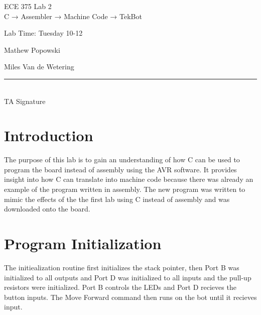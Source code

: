 \documentclass[12pt,letterpaper]{article}
\begin{document}
\begin{titlepage}
    \vspace*{4cm}
    \begin{flushright}
    {\huge
        ECE 375 Lab 2\\[1cm]
    }
    {\large
        C → Assembler → Machine Code → TekBot
    }
    \end{flushright}
    \begin{flushleft}
    Lab Time: Tuesday 10-12
    \end{flushleft}
    \begin{flushright}
    Mathew Popowski

    Miles Van de Wetering
    \vfill
    \rule{5in}{.5mm}\\
    TA Signature
    \end{flushright}

\end{titlepage}

\section{Introduction}
The purpose of this lab is to gain an understanding of how C can be used to program the board instead of assembly using the AVR software. It provides insight into how C can translate into machine code because there was already an example of the program written in assembly. The new program was written to mimic the effects of the the first lab using C instead of assembly and was downloaded onto the board.




\section{Program Initialization}
The initiealization routine first initializes the stack pointer, then Port B was initialized to all outputs and Port D was initialized to all inputs and the pull-up resistors were initialized. Port B controls the LEDs and Port D recieves the button inputs. The Move Forward command then runs on the bot until it recieves input. 
\end{document}
